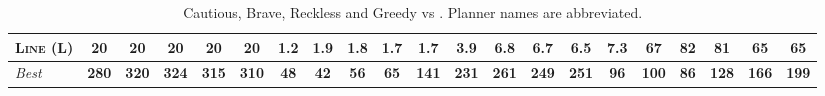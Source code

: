 \documentclass[11pt,landscape]{article}
\begin{document}
\begin{table}[tb]
{\begin{tabular}{|l||ccccc||ccccc||ccccc||ccccc||}
\textsc{Line} (L)&\textbf{20}&\textbf{20}&\textbf{20}&\textbf{20}&\textbf{20}&\textbf{1.2}&1.9&1.8&1.7&1.7&\textbf{3.9}&6.8&6.7&6.5&7.3&67&82&81&\textbf{65}&\textbf{65}
\\\hline
\textit{Best}&\textbf{280}&\textbf{320}&\textbf{324}&\textbf{315}&\textbf{310}&\textbf{48}&\textbf{42}&\textbf{56}&\textbf{65}&\textbf{141}&\textbf{231}&\textbf{261}&\textbf{249}&\textbf{251}&\textbf{96}&\textbf{100}&\textbf{86}&\textbf{128}&\textbf{166}&\textbf{199}\\\hline

        \end{tabular}}
        \caption{Cautious, Brave, Reckless and Greedy \pattyd vs \pattyo. Planner names are abbreviated.}
        \label{tab:cbrg}
        \end{table}
        
\end{document}
